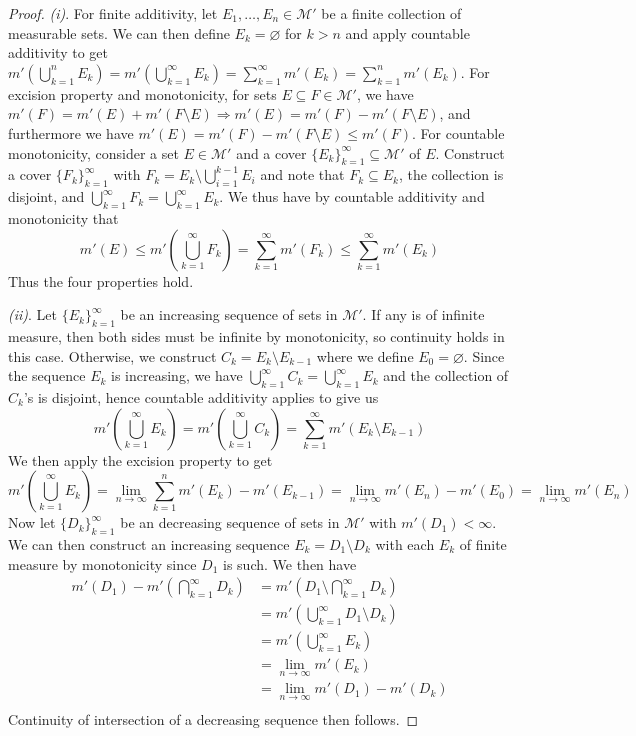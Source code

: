 \documentclass{article}
\renewcommand{\implies}{\Rightarrow}
\theoremstyle{definition} %
\numberwithin{thm}{section} %
\theoremstyle{definition} %
\begin{document}
\begin{proof}
\textit{(i)}. For finite additivity, let $E_1, \dots, E_n \in \mathcal{M}'$ be a finite collection of measurable sets. We can then define $E_k = \varnothing$ for $k > n$ and apply countable additivity to get $m'(\bigcup_{k = 1}^n E_k) = m'(\bigcup_{k = 1}^\infty E_k) = \sum_{k = 1}^\infty m'(E_k) = \sum_{k = 1}^n m'(E_k)$. For excision property and monotonicity, for sets $E \subseteq F \in \mathcal{M}'$, we have $m'(F) = m'(E) + m'(F \setminus E) \implies m'(E) = m'(F) - m'(F \setminus E)$, and furthermore we have $m'(E) = m'(F) - m'(F \setminus E) \leq m'(F)$. For countable monotonicity, consider a set $E \in \mathcal{M}'$ and a cover ${\{E_k\}}_{k = 1}^\infty \subseteq \mathcal{M}'$ of $E$. Construct a cover ${\{F_k\}}_{k = 1}^\infty$ with $F_k = E_k \setminus \bigcup_{i = 1}^{k - 1} E_i$ and note that $F_k \subseteq E_k$, the collection is disjoint, and $\bigcup_{k = 1}^\infty F_k = \bigcup_{k = 1}^\infty E_k$. We thus have by countable additivity and monotonicity that
\[ m'(E) \leq m'\left(\bigcup_{k = 1}^\infty F_k\right) = \sum_{k = 1}^\infty m'(F_k) \leq \sum_{k = 1}^\infty m'(E_k) \]
Thus the four properties hold.

\textit{(ii)}. Let ${\{E_k\}}_{k = 1}^\infty$ be an increasing sequence of sets in $\mathcal{M}'$. If any is of infinite measure, then both sides must be infinite by monotonicity, so continuity holds in this case. Otherwise, we construct $C_k = E_k \setminus E_{k - 1}$ where we define $E_0 = \varnothing$. Since the sequence $E_k$ is increasing, we have $\bigcup_{k = 1}^\infty C_k = \bigcup_{k = 1}^\infty E_k$ and the collection of $C_k$'s is disjoint, hence countable additivity applies to give us 
\[ m'\left(\bigcup_{k = 1}^\infty E_k\right) = m'\left(\bigcup_{k = 1}^\infty C_k\right) = \sum_{k = 1}^\infty m'(E_k \setminus E_{k - 1}) \]
We then apply the excision property to get 
\[ m'\left(\bigcup_{k = 1}^\infty E_k\right) = \lim_{n \to \infty}\sum_{k = 1}^n m'(E_k) - m'(E_{k - 1}) = \lim_{n \to \infty} m'(E_n) - m'(E_0) = \lim_{n \to \infty} m'(E_n) \]
Now let ${\{D_k\}}_{k = 1}^\infty$ be an decreasing sequence of sets in $\mathcal{M}'$ with $m'(D_1) < \infty$. We can then construct an increasing sequence $E_k = D_1 \setminus D_k$ with each $E_k$ of finite measure by monotonicity since $D_1$ is such. We then have
\begin{align*}
    m'(D_1) - m'\left(\bigcap_{k = 1}^\infty D_k\right) 
    &= m'\left(D_1 \setminus \bigcap_{k = 1}^\infty D_k\right) \\
    &= m'\left(\bigcup_{k = 1}^\infty D_1 \setminus D_k\right) \\
    &= m'\left(\bigcup_{k = 1}^\infty E_k\right) \\
    &= \lim_{n \to \infty} m'(E_k) \\
    &= \lim_{n \to \infty} m'(D_1) - m'(D_k) \\
\end{align*}
Continuity of intersection of a decreasing sequence then follows.
\end{proof}
\end{document}
